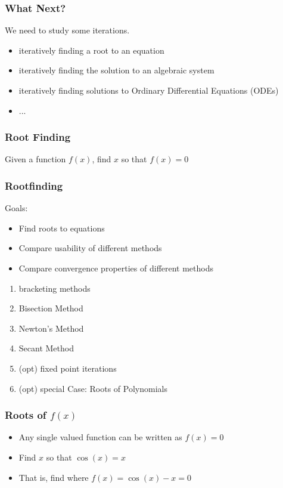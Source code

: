 \documentclass[10pt]{beamer}
\begin{document}
\begin{frame}
\frametitle{What Next?}
We need to study some iterations.
\begin{itemize}
  \item iteratively finding a root to an equation
  \item iteratively finding the solution to an algebraic system
  \item iteratively finding solutions to Ordinary Differential Equations
  (ODEs)
  \item ...
\end{itemize}
\end{frame}
\begin{frame}
\frametitle{Root Finding}
Given a function $f(x)$, find $x$ so that $f(x) = 0$
\end{frame}
\begin{frame}
\frametitle{Rootfinding}
Goals:
\begin{itemize}
  \item Find roots to equations
  \item Compare usability of different methods
  \item Compare convergence properties of different methods
\end{itemize}
\begin{enumerate}
  \item bracketing methods
  \item Bisection Method
  \item Newton's Method
  \item Secant Method
  \item (opt) fixed point iterations
  \item (opt) special Case: Roots of Polynomials
\end{enumerate}
\end{frame}
\begin{frame}
\frametitle{Roots of $f(x)$}
\begin{itemize}
\item Any single valued function can be written as $f(x)=0$
\end{itemize}
\begin{example}
\begin{itemize}
  \item Find $x$ so that $\cos{(x)} = x$
  \item That is, find where $f(x) = \cos{(x)} - x = 0$
\end{itemize}
\centering
{}
\end{example}
\end{frame}
\end{document}
